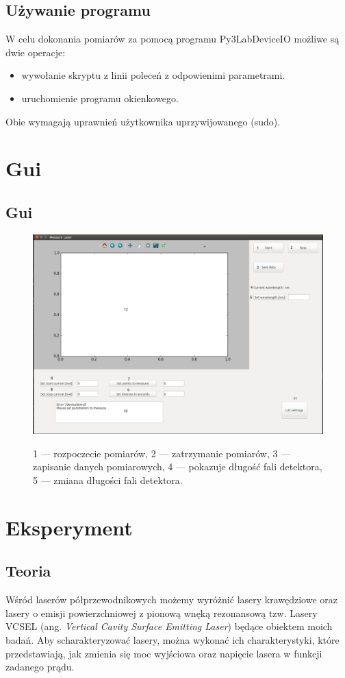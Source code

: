 \documentclass[a4paper, portrait,12pt]{report}
\begin{document}
\section{Używanie programu}
W celu dokonania pomiarów za pomocą programu Py3LabDeviceIO możliwe są dwie operacje:
\begin{itemize}
\item wywołanie skryptu z linii poleceń z odpowienimi parametrami.
\item uruchomienie programu okienkowego.
\end{itemize}
Obie wymagają uprawnień użytkownika uprzywijowanego (sudo).
\newpage
\chapter{Gui}
\section{Gui}
\begin{figure}[h]
\center
  \includegraphics[scale=0.35]{gui.png}
  \label{rys1}
  \caption{1 --- rozpoczecie pomiarów, 2 --- zatrzymanie pomiarów, 3 --- zapisanie danych pomiarowych, 4 --- pokazuje długość fali detektora, 5 --- zmiana długości fali detektora.} 
\end{figure}
\chapter{Eksperyment} \label{Eksperyment}
\section{Teoria}
Wśród laserów półprzewodnikowych możemy wyróżnić lasery krawędziowe oraz lasery o emisji powierzchniowej z pionową wnęką rezonansową tzw. Lasery VCSEL (ang. \textit{Vertical Cavity Surface Emitting Laser}) będące obiektem moich badań. Aby scharakteryzować lasery, można wykonać ich charakterystyki, które przedstawiają, jak zmienia się moc wyjściowa oraz napięcie lasera w funkcji zadanego prądu. \\
\end{document}
